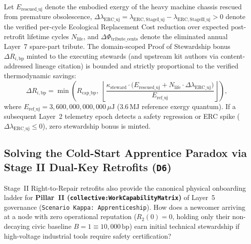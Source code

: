 \begin{theorem}
\label{thm:l2-retrofit-stewardship}
Let $E_{\mathrm{rescued\_uj}}$ denote the embodied exergy of the heavy machine chassis rescued from premature obsolescence, $\Delta \lambda_{\mathrm{ERC\_uj}} = \lambda_{\mathrm{ERC,StageI\_uj}} - \lambda_{\mathrm{ERC,StageII\_uj}} > 0$ denote the verified per-cycle Ecological Replacement Cost reduction over expected post-retrofit lifetime cycles $N_{\mathrm{life}}$, and $\Delta \Phi_{\mathrm{tribute\_cents}}$ denote the eliminated annual Layer~7 spare-part tribute. The domain-scoped Proof of Stewardship bonus $\Delta R_{i,\mathrm{bp}}$ minted to the executing stewards (and upstream kit authors via content-addressed lineage citation) is bounded and strictly proportional to the verified thermodynamic savings:
\begin{equation}
    \Delta R_{i,\mathrm{bp}} = \min\!\left( R_{\mathrm{cap\_bp}},\; \left\lfloor \frac{\kappa_{\mathrm{steward}} \cdot \bigl(E_{\mathrm{rescued\_uj}} + N_{\mathrm{life}} \cdot \Delta \lambda_{\mathrm{ERC\_uj}}\bigr)}{E_{\mathrm{ref\_uj}}} \right\rfloor \right),
    \label{eq:l2-retrofit-delta-r}
\end{equation}
where $E_{\mathrm{ref\_uj}} = 3{,}600{,}000{,}000{,}000\,\mu\mathrm{J}$ ($3.6\,\mathrm{MJ}$ reference exergy quantum). If a subsequent Layer~2 telemetry epoch detects a safety regression or ERC spike ($\Delta \lambda_{\mathrm{ERC\_uj}} \le 0$), zero stewardship bonus is minted.
\end{theorem}

\subsection{Solving the Cold-Start Apprentice Paradox via Stage II Dual-Key Retrofits (\texttt{D6})}

Stage~II Right-to-Repair retrofits also provide the canonical physical onboarding ladder for \textbf{Pillar~II (\texttt{collective:WorkCapabilityMatrix})} of Layer~5 governance (\texttt{Scenario Kappa: Apprenticeship}). How does a newcomer arriving at a node with zero operational reputation ($R_2(0) = 0$, holding only their non-decaying civic baseline $B = 1 \equiv 10{,}000\,\mathrm{bp}$) earn initial technical stewardship if high-voltage industrial tools require safety certification?

